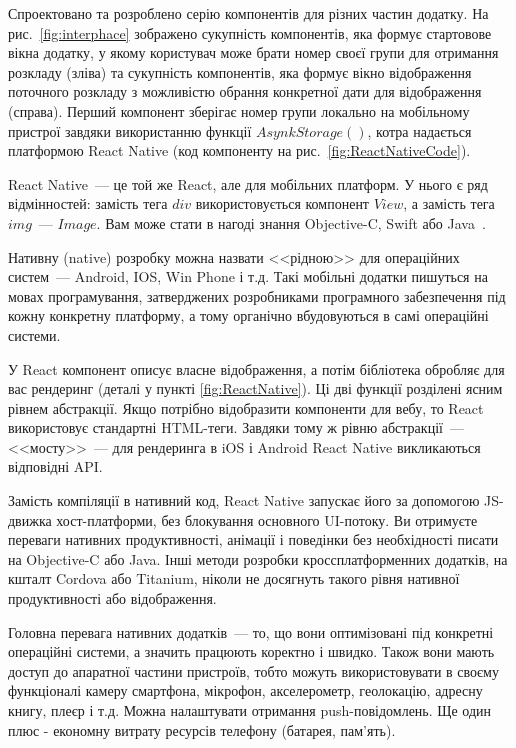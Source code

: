 Спроектовано та розроблено серію компонентів для різних частин додатку. На рис.~\ref{fig:interphace} зображено сукупність компонентів, яка формує стартовове вікна додатку, у якому користувач може брати номер своєї групи для отримання розкладу (зліва) та сукупність компонентів, яка формує вікно відображення поточного розкладу з можливістю обрання конкретної дати для відображення (справа). Перший компонент зберігає номер групи локально на мобільному пристрої завдяки використанню функції $AsynkStorage()$, котра надається платформою React Native (код компоненту на рис.~\ref{fig:ReactNativeCode}).


React Native~--- це той же React, але для мобільних платформ. У нього є ряд відмінностей: замість тега $div$ використовується компонент $View$, а замість тега $img$~--- $Image$. Вам може стати в нагоді знання Objective-C, Swift або Java~\cite{9781787282537}. 

Нативну (native) розробку можна назвати <<рідною>> для операційних систем~--- Android, IOS, Win Phone і т.д. Такі мобільні додатки пишуться на мовах програмування, затверджених розробниками програмного забезпечення під кожну конкретну платформу, а тому органічно вбудовуються в самі операційні системи.

У React компонент описує власне відображення, а потім бібліотека обробляє для вас рендеринг (деталі у пункті \ref{fig:ReactNative}). Ці дві функції розділені ясним рівнем абстракції. Якщо потрібно відобразити компоненти для вебу, то React використовує стандартні HTML-теги. Завдяки тому ж рівню абстракції~--- <<мосту>>~--- для рендеринга в iOS і Android React Native викликаються відповідні API.


Замість компіляції в нативний код, React Native запускає його за допомогою JS-движка хост-платформи, без блокування основного UI-потоку. Ви отримуєте переваги нативних продуктивності, анімації і поведінки без необхідності писати на Objective-C або Java. Інші методи розробки кроссплатформенних додатків, на кшталт Cordova або Titanium, ніколи не досягнуть такого рівня нативної продуктивності або відображення.

Головна перевага нативних додатків~--- то, що вони оптимізовані під конкретні операційні системи, а значить працюють коректно і швидко. Також вони мають доступ до апаратної частини пристроїв, тобто можуть використовувати в своєму функціоналі камеру смартфона, мікрофон, акселерометр, геолокацію, адресну книгу, плеєр і т.д. Можна налаштувати отримання push-повідомлень. Ще один плюс - економну витрату ресурсів телефону (батарея, пам'ять).

